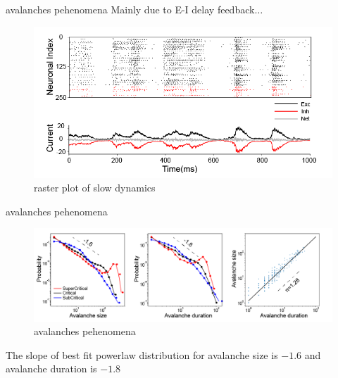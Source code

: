 \documentclass{beamer}
\begin{document}
\begin{frame}{avalanches pehenomena}
	Mainly due to E-I delay feedback$\ldots$
	\begin{figure}[htbp]
		\centering
		\includegraphics[width=0.9\linewidth]{fig/raster}
		\caption{raster plot of slow dynamics}
		\label{raster plot}
	\end{figure}
\end{frame}
	
\begin{frame}{avalanches pehenomena}
	\begin{figure}[htbp]
		\centering
		\includegraphics[width=0.9\linewidth]{fig/avalanches_distribution}
		\caption{avalanches pehenomena}
	\end{figure}
	The slope of best fit powerlaw distribution for avalanche size is $ -1.6 $ and avalanche duration is $ -1.8 $
\end{frame}
\end{document}
